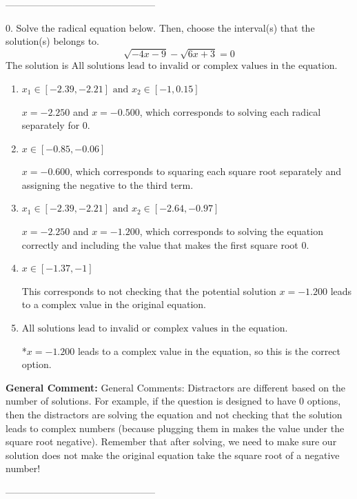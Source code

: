 \documentclass{extbook}[14pt]
\begin{document}
-----------------------------------------------

0. Solve the radical equation below. Then, choose the interval(s) that the solution(s) belongs to.
\[ \sqrt{-4 x - 9} - \sqrt{6 x + 3} = 0 \] 
The solution is $ \text{All solutions lead to invalid or complex values in the equation.} $ 

\begin{enumerate}[label=\Alph*.] 
\item $ x_1 \in [-2.39, -2.21] \text{ and } x_2 \in [-1,0.15] $ 

 $x = -2.250$ and $x = -0.500$, which corresponds to solving each radical separately for 0. 
\item $ x \in [-0.85,-0.06] $ 

 $x = -0.600$, which corresponds to squaring each square root separately and assigning the negative to the third term. 
\item $ x_1 \in [-2.39, -2.21] \text{ and } x_2 \in [-2.64,-0.97] $ 

 $x = -2.250$ and $x = -1.200$, which corresponds to solving the equation correctly and including the value that makes the first square root 0. 
\item $ x \in [-1.37,-1] $ 

 This corresponds to not checking that the potential solution $x = -1.200$ leads to a complex value in the original equation. 
\item $ \text{All solutions lead to invalid or complex values in the equation.} $ 

 *$x = -1.200$ leads to a complex value in the equation, so this is the correct option. 
\end{enumerate} 
 
\textbf{General Comment:} General Comments: Distractors are different based on the number of solutions. For example, if the question is designed to have 0 options, then the distractors are solving the equation and not checking that the solution leads to complex numbers (because plugging them in makes the value under the square root negative). Remember that after solving, we need to make sure our solution does not make the original equation take the square root of a negative number! 

-----------------------------------------------
\end{document}

